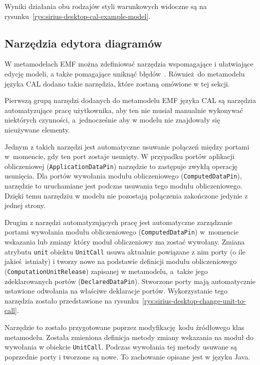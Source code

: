 Wyniki działania obu rodzajów styli warunkowych widoczne są na
rysunku~\ref{rys:sirius-desktop-cal-example-model}.

\subsection{Narzędzia edytora diagramów}\label{sec:cal-metamodel-tools}

W metamodelach \gls{EMF} można zdefiniować narzędzia wspomagające i ułatwiające
edycję modeli, a także pomagające uniknąć
błędów~\cite{sirius-desktop-documentation-tools}. Również do metamodelu języka
CAL dodano takie narzędzia, które zostaną omówione w tej sekcji.

Pierwszą grupą narzędzi dodanych do metamodelu EMF języka CAL są narzędzia
automatyzujące pracę użytkownika, aby ten nie musiał manualnie wykonywać
niektórych czynności, a~jednocześnie aby w modelu nie znajdowały się nieużywane
elementy.

Jednym z takich narzędzi jest automatyczne usuwanie połączeń między portami
w~momencie, gdy ten port zostaje usunięty. W przypadku portów aplikacji
obliczeniowej (\texttt{ApplicationDataPin}) narzędzie to zastępuje zwykłą
operację usunięcia. Dla portów wywołania modułu obliczeniowego
(\texttt{ComputedDataPin}), narzędzie to uruchamiane jest podczas usuwania tego
modułu obliczeniowego. Dzięki temu narzędziu w modelu nie pozostają połączenia
zakończone jedynie z jednej strony.

Drugim z narzędzi automatyzujących pracę jest automatyczne zarządzanie
portami wywołania modułu obliczeniowego (\texttt{ComputedDataPin}) w~momencie
wskazania lub zmiany który moduł obliczeniowy ma zostać wywołany. Zmiana
atrybutu \texttt{unit} obiektu \texttt{UnitCall} usuwa aktualnie powiązane z
nim porty (o ile jakieś istniały) i tworzy nowe na podstawie definicji modułu
obliczeniowego (\texttt{ComputationUnitRelease}) zapisanej w metamodelu,
a~także jego zdeklarowanych portów (\texttt{DeclaredDataPin}). Stworzone porty
mają
automatycznie ustawione odwołania na właściwe deklaracje portów.
Wykorzystanie tego narzędzia zostało przedstawione na
rysunku~\ref{rys:sirius-desktop-change-unit-to-call}.

Narzędzie to zostało przygotowane poprzez modyfikację kodu źródłowego klas
metamodelu. Została zmieniona definicja metody zmiany wskazania na moduł do
wywołania w obiekcie \texttt{UnitCall}. Podczas wywołania tej metody usuwane są
poprzednie porty i tworzone są nowe. To zachowanie opisane jest w języku Java.

